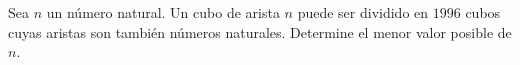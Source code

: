 Sea $n$ un número natural. Un cubo de arista $n$ puede ser dividido en $1996$ cubos cuyas aristas son también números naturales. Determine el menor valor posible de $n$.

